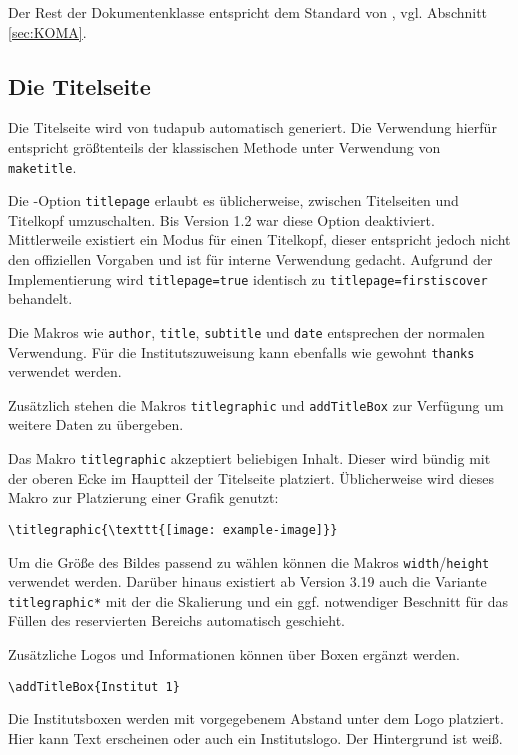 \documentclass[
	german,%
	accentcolor=9c,%
]{tudapub}
\newcommand*{\code}[1]{\texttt{#1}}
\begin{document}
\noindent Der Rest der Dokumentenklasse entspricht dem Standard von \KOMAScript, vgl. Abschnitt \ref{sec:KOMA}.

\subsection{Die Titelseite}
\label{sec:title}

Die Titelseite wird von tudapub automatisch generiert. Die Verwendung hierfür entspricht größtenteils der klassischen Methode unter Verwendung von \code{maketitle}.

Die \KOMAScript-Option \code{titlepage} erlaubt es üblicherweise, zwischen Titelseiten und Titelkopf umzuschalten. Bis Version 1.2 war diese Option deaktiviert. Mittlerweile existiert ein Modus für einen Titelkopf, dieser entspricht jedoch nicht den offiziellen Vorgaben und ist für interne Verwendung gedacht. Aufgrund der Implementierung wird \code{titlepage=true} identisch zu \code{titlepage=firstiscover} behandelt.

Die Makros wie \code{author}, \code{title}, \code{subtitle} und \code{date} entsprechen der normalen Verwendung. Für die Institutszuweisung kann ebenfalls wie gewohnt \code{thanks} verwendet werden.

Zusätzlich stehen die Makros \code{titlegraphic} und \code{addTitleBox} zur Verfügung um weitere Daten zu übergeben.

Das Makro \code{titlegraphic} akzeptiert beliebigen Inhalt. Dieser wird bündig mit der oberen Ecke im Hauptteil der Titelseite platziert.
Üblicherweise wird dieses Makro zur Platzierung einer Grafik genutzt:

\begin{verbatim}
\titlegraphic{\texttt{[image: example-image]}}
\end{verbatim}

Um die Größe des Bildes passend zu wählen können die Makros \code{width}/\code{height} verwendet werden. Darüber hinaus existiert ab Version 3.19 auch die Variante \code{titlegraphic*} mit der die Skalierung und ein ggf. notwendiger Beschnitt für das Füllen des reservierten Bereichs automatisch geschieht.

Zusätzliche Logos und Informationen können über Boxen ergänzt werden.

\begin{verbatim}
\addTitleBox{Institut 1}
\end{verbatim}
Die Institutsboxen werden mit vorgegebenem Abstand unter dem Logo platziert. Hier kann Text erscheinen oder auch ein Institutslogo. Der Hintergrund ist weiß.
\end{document}
